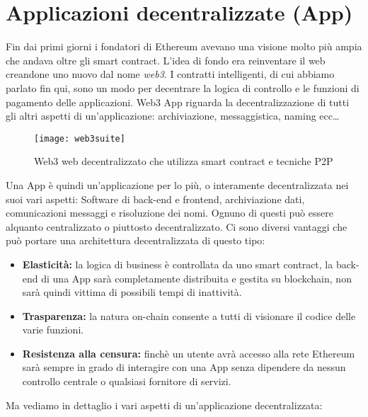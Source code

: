 \section{Applicazioni decentralizzate (\DH App)}
Fin dai primi giorni i fondatori di Ethereum avevano una visione molto più ampia che andava oltre gli smart contract. L'idea di fondo era reinventare il web creandone uno nuovo dal nome \textit{web3}. I contratti intelligenti, di cui abbiamo parlato fin qui, sono un modo per decentrare la logica di controllo e le funzioni di pagamento delle applicazioni. Web3 \DH App riguarda la decentralizzazione di tutti gli altri aspetti di un'applicazione: archiviazione, messaggistica, naming ecc\dots
%
\begin{figure}
\centering 
\texttt{[image: web3suite]} 
\caption[Web3 web decentralizzato che utilizza smart contract e tecniche P2P]{Web3 web decentralizzato che utilizza smart contract e tecniche P2P}
\label{fig:web3siute} 
\end{figure}
%
Una \DH App è quindi un'applicazione per lo più, o interamente decentralizzata nei suoi vari aspetti: Software di back-end e frontend, archiviazione dati, comunicazioni messaggi e risoluzione dei nomi. Ognuno di questi può essere alquanto centralizzato o piuttosto decentralizzato. Ci sono diversi vantaggi che può portare una architettura decentralizzata di questo tipo:
\begin{itemize}
	\item \textbf{Elasticità:} la logica di business è controllata da uno smart contract, la back-end di una \DH App sarà completamente distribuita e gestita su blockchain, non sarà quindi vittima di possibili tempi di inattività.
	\item \textbf{Trasparenza:} la natura on-chain consente a tutti di visionare il codice delle varie funzioni.
	\item \textbf{Resistenza alla censura:} finchè un utente avrà accesso alla rete Ethereum sarà sempre in grado di interagire con una \DH App senza dipendere da nessun controllo centrale o qualsiasi fornitore di servizi.
\end{itemize}
Ma vediamo in dettaglio i vari aspetti di un'applicazione decentralizzata:

